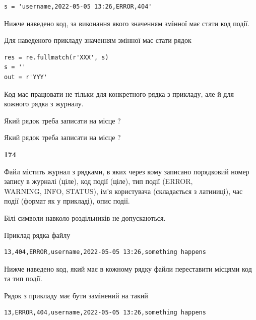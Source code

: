 \begin{verbatim}
s = 'username,2022-05-05 13:26,ERROR,404'
\end{verbatim}


Нижче наведено код, за виконання якого значенням змінної  має стати код події.

Для наведеного прикладу значенням змінної  має стати рядок 



\begin{verbatim}
res = re.fullmatch(r'XXX', s)
s = ''
out = r'YYY'
\end{verbatim}


Код має працювати не тільки для конкретного рядка з прикладу, але й для кожного рядка з журналу.




Який рядок треба записати на місце  ?\par
\vspace{5mm}


Який рядок треба записати на місце  ?\par


\newpage

{\begin {center}\textbf{ 174}\end {center}}\par
Файл  містить журнал з рядками, в яких через кому записано поряд\-ко\-вий номер запису в журналі (ціле), код події (ціле), тип події (ERROR,\\ WARNING, INFO, STATUS), ім'я користувача (складається з латиниці), час події (фор\-мат як у прикладі), опис події.

Білі символи навколо роздільників не допускаються.

Приклад рядка файлу



\begin{verbatim}
13,404,ERROR,username,2022-05-05 13:26,something happens
\end{verbatim}


Нижче наведено код, який має в кожному рядку файли переставити місцями код та тип події.

Рядок з прикладу має бути замінений на такий



\begin{verbatim}
13,ERROR,404,username,2022-05-05 13:26,something happens
\end{verbatim}




